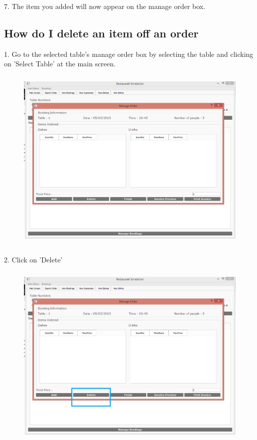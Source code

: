 7. The item you added will now appear on the manage order box.

\newpage
\subsection{How do I delete an item off an order}

1. Go to the selected table's manage order box by selecting the table and clicking on 'Select Table' at the main screen.

\begin{figure}[H]
    \includegraphics[height = 9cm]{./Manual/images/base/ManageOrder} 
    \caption{} \label{fig:additemorder1}
\end{figure}

2. Click on 'Delete'

\begin{figure}[H]
    \includegraphics[height = 9cm]{./Manual/images/DeleteItemOrder1} 
    \caption{} \label{fig:deleteitemorder2}
\end{figure}

